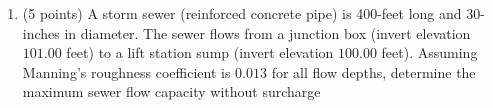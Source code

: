 \documentclass[12pt]{article}
\begin{document}
\begin{enumerate}
%
\item (5 points)  A storm sewer (reinforced concrete pipe) is 400-feet long and 30-inches in diameter.  The sewer flows from a junction box (invert elevation $101.00$ feet) to a lift station sump (invert elevation $100.00$ feet).  Assuming Manning's roughness coefficient is $0.013$ for all flow depths, determine the maximum sewer  flow capacity without surcharge 




\end{enumerate}
\end{document}
